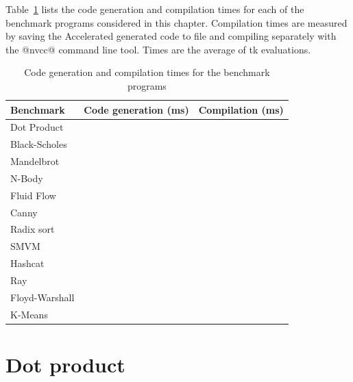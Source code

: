 Table~\ref{tab:compilation_times} lists the code generation and compilation
times for each of the benchmark programs considered in this chapter. Compilation
times are measured by saving the Accelerated generated code to file and
compiling separately with the @nvcc@ command line tool. Times are the average of
tk evaluations.

\begin{table}
    \centering
    \begin{tabular}{lrr}
\textbf{Benchmark}
    & \multicolumn{1}{c}{Code generation (ms)}
    & \multicolumn{1}{c}{Compilation (ms)}
    \\
    \hline

Dot Product
    &
    &
    \\

Black-Scholes
    &
    &
    \\

Mandelbrot
    &
    &
    \\

N-Body
    &
    &
    \\

Fluid Flow
    &
    &
    \\

Canny
    &
    &
    \\

Radix sort
    &
    &
    \\

SMVM
    &
    &
    \\

Hashcat
    &
    &
    \\

Ray
    &
    &
    \\

Floyd-Warshall
    &
    &
    \\

K-Means
    &
    &
    \\

    \end{tabular}
    \caption{Code generation and compilation times for the benchmark programs}
    \label{tab:compilation_times}
\end{table}



\section{Dot product}
\label{sec:dotp}

